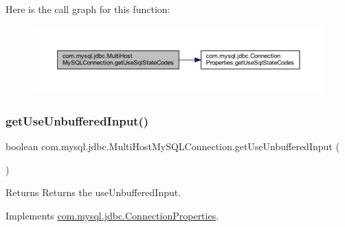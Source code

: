 Here is the call graph for this function\+:
\nopagebreak
\begin{figure}[H]
\begin{center}
\leavevmode
\includegraphics[width=350pt]{classcom_1_1mysql_1_1jdbc_1_1_multi_host_my_s_q_l_connection_a37a3f2b05b0f82fbc27d8a197bb6cd70_cgraph}
\end{center}
\end{figure}
\mbox{\label{classcom_1_1mysql_1_1jdbc_1_1_multi_host_my_s_q_l_connection_a4d1dd6152a4a012bf93be333f0e98aba}} 
\subsubsection{\texorpdfstring{get\+Use\+Unbuffered\+Input()}{getUseUnbufferedInput()}}
{\footnotesize\ttfamily boolean com.\+mysql.\+jdbc.\+Multi\+Host\+My\+S\+Q\+L\+Connection.\+get\+Use\+Unbuffered\+Input (\begin{DoxyParamCaption}{ }\end{DoxyParamCaption})}

\begin{DoxyReturn}{Returns}
Returns the use\+Unbuffered\+Input. 
\end{DoxyReturn}


Implements \mbox{\hyperlink{interfacecom_1_1mysql_1_1jdbc_1_1_connection_properties_a7776bd98c8537739178d1c9a42bd9e8c}{com.\+mysql.\+jdbc.\+Connection\+Properties}}.

